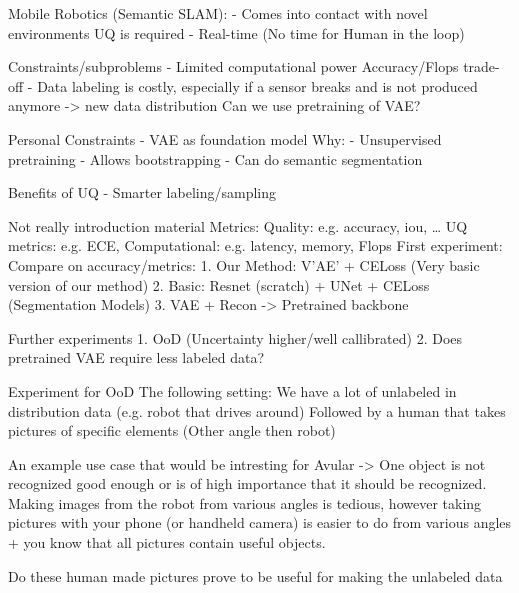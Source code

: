 Mobile Robotics (Semantic SLAM):
- Comes into contact with novel environments
UQ is required
- Real-time (No time for Human in the loop)


Constraints/subproblems
- Limited computational power
Accuracy/Flops trade-off
- Data labeling is costly, especially if a sensor breaks and is not produced anymore -> new data distribution
Can we use pretraining of VAE?

Personal Constraints
- VAE as foundation model
Why:
- Unsupervised pretraining
- Allows bootstrapping
- Can do semantic segmentation

Benefits of UQ
- Smarter labeling/sampling

Not really introduction material
Metrics:
Quality: e.g. accuracy, iou, \dots
UQ metrics: e.g. ECE,
Computational: e.g. latency, memory, Flops
First experiment: Compare on accuracy/metrics:
1. Our Method: V'AE' + CELoss (Very basic version of our method)
2. Basic: Resnet (scratch) + UNet + CELoss (Segmentation Models)
3. VAE + Recon -> Pretrained backbone

Further experiments
1. OoD (Uncertainty higher/well callibrated)
2. Does pretrained VAE require less labeled data?

Experiment for OoD
The following setting:
We have a lot of unlabeled in distribution data (e.g. robot that drives around)
Followed by a human that takes pictures of specific elements (Other angle then robot)

An example use case that would be intresting for Avular -> One object is not recognized good enough or is of high importance that it should be recognized. Making images from the robot from various angles is tedious, however taking pictures with your phone (or handheld camera) is easier to do from various angles + you know that all pictures contain useful objects.

Do these human made pictures prove to be useful for making the unlabeled data